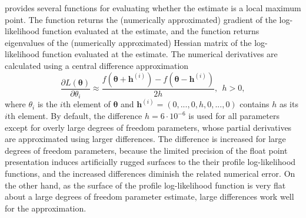 \documentclass[nojss]{jss} %
\begin{document}
 provides several functions for evaluating whether the estimate is a local maximum point. The function  returns the (numerically approximated) gradient of the log-likelihood function evaluated at the estimate, and the function  returns eigenvalues of the (numerically approximated) Hessian matrix of the log-likelihood function evaluated at the estimate. The numerical derivatives are calculated using a central difference approximation
\begin{equation}
\frac{\partial L(\boldsymbol{\theta})}{\partial \theta_i} \approx \frac{f(\boldsymbol{\theta} + \boldsymbol{h}^{(i)}) - f(\boldsymbol{\theta} - \boldsymbol{h}^{(i)})}{2h}, \ \ h>0,
\end{equation}
where $\theta_i$ is the $i$th element of $\boldsymbol{\theta}$ and $\boldsymbol{h}^{(i)}=(0,...,0,h,0,...,0)$
contains $h$ as its $i$th element. By default, the difference $h=6\cdot 10^{-6}$ is used for all parameters except for overly large degrees of freedom parameters, whose partial derivatives are approximated using larger differences. The difference is increased for large degrees of freedom parameters, because the limited precision of the float point presentation induces artificially rugged surfaces to the their profile log-likelihood functions, and the increased differences diminish the related numerical error. On the other hand, as the surface of the profile log-likelihood function is very flat about a large degrees of freedom parameter estimate, large differences work well for the approximation.
\end{document}
